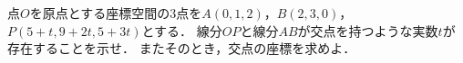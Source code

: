 \documentclass[../../main.tex]{subfiles}
\begin{document}
点$O$を原点とする座標空間の3点を$A(0,1,2)$，$B(2,3,0)$，$P(5+t,9+2t,5+3t)$とする．
線分$OP$と線分$AB$が交点を持つような実数$t$が存在することを示せ．
またそのとき，交点の座標を求めよ．
\end{document}
